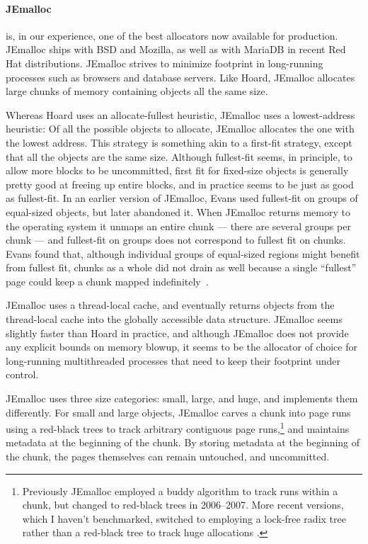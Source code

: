 \documentclass{sigplanconf}
\begin{document}
{\paragraph{JEmalloc}} \cite{Evans06} is, in our experience, one of
the best allocators now available for production.  JEmalloc ships with
BSD and Mozilla, as well as with MariaDB in recent Red Hat
distributions.  JEmalloc strives to minimize footprint in long-running
processes such as browsers and database servers.  Like Hoard, JEmalloc
allocates large chunks of memory containing objects all the same size.

Whereas Hoard uses an allocate-fullest heuristic, JEmalloc uses a
lowest-address heuristic: Of all the possible objects to allocate,
JEmalloc allocates the one with the lowest address.  This strategy is
something akin to a first-fit strategy, except that all the objects
are the same size.  Although fullest-fit seems, in principle, to allow
more blocks to be uncommitted, first fit for fixed-size objects is
generally pretty good at freeing up entire blocks, and in practice
seems to be just as good as fullest-fit.  In an earlier version of
JEmalloc, Evans used fullest-fit on groups of equal-sized objects, but
later abandoned it.  When JEmalloc returns memory to the operating
system it unmaps an entire chunk --- there are several groups per
chunk --- and fullest-fit on groups does not correspond to fullest fit
on chunks. Evans found that, although individual groups of equal-sized
regions might benefit from fullest fit, chunks as a whole did not
drain as well because a single ``fullest'' page could keep a chunk
mapped indefinitely~\cite{Evans15-personal-communication}.  

JEmalloc uses a thread-local cache, and eventually returns objects
from the thread-local cache into the globally accessible data
structure.  JEmalloc seems slightly faster than Hoard in practice, and
although JEmalloc does not provide any explicit bounds on memory
blowup, it seems to be the allocator of choice for long-running
multithreaded processes that need to keep their footprint under
control.

JEmalloc uses three size categories: small, large, and huge, and
implements them differently. For small and large objects, JEmalloc
carves a chunk into page runs using a red-black trees to track
arbitrary contiguous page runs,\footnote{Previously JEmalloc employed
  a buddy algorithm to track runs within a chunk, but changed to
  red-black trees in 2006--2007.  More recent versions, which I
  haven't benchmarked, switched to employing a lock-free radix tree
  rather than a red-black tree to track huge allocations
  \cite{Evans15-personal-communication}.} and maintains metadata at
the beginning of the chunk.  By storing metadata at the beginning of
the chunk, the pages themselves can remain untouched, and uncommitted.
\end{document}
